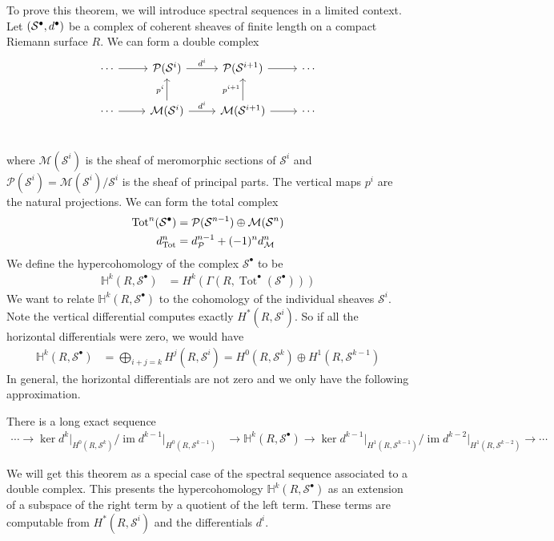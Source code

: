 \documentclass[12pt]{article}
\begin{document}
To prove this theorem, we will introduce spectral sequences in a limited context. Let $({\mathcal{S}}^{\bullet},d^{\bullet})$ be a complex of coherent sheaves of finite length on a compact Riemann surface $R$. We can form a double complex 
\[
\begin{tikzcd}[row sep=2em]
    \cdots \arrow[r] & \mathcal{P}(\mathcal{S}^i) \arrow[r, "d^i"] & \mathcal{P}(\mathcal{S}^{i+1}) \arrow[r] & \cdots \\
    \cdots \arrow[r] & \mathcal{M}(\mathcal{S}^i) \arrow[r, "d^i"] \arrow[u, "p^i"] & \mathcal{M}(\mathcal{S}^{i+1}) \arrow[r] \arrow[u, "p^{i+1}"] & \cdots \\
\end{tikzcd}
\] where $\mathcal{M}(\mathcal{S}^i)$ is the sheaf of meromorphic sections of $\mathcal{S}^i$ and $\mathcal{P}(\mathcal{S}^i) = \mathcal{M}(\mathcal{S}^i)/\mathcal{S}^i$ is the sheaf of principal parts. The vertical maps $p^i$ are the natural projections. We can form the total complex \begin{align*}
    \operatorname{Tot}^n(\mathcal{S}^{\bullet}) & = {\mathcal{P}}(\mathcal{S}^{n-1}) \oplus \mathcal{M}(\mathcal{S}^n) \\
    d_{\operatorname{Tot}}^n & = d_{{\mathcal{P}}}^{n-1} + (-1)^n d_{\mathcal{M}}^n
\end{align*} We define the hypercohomology of the complex $\mathcal{S}^{\bullet}$ to be \begin{align*}
    \mathbb{H}^k(R,\mathcal{S}^{\bullet}) & =  H^k(\Gamma(R,\operatorname{Tot}^{\bullet}(\mathcal{S}^{\bullet})))
\end{align*} We want to relate $\mathbb{H}^k(R,\mathcal{S}^{\bullet})$ to the cohomology of the individual sheaves $\mathcal{S}^i$. Note the vertical differential computes exactly $H^*(R,\mathcal{S}^i)$. So if all the horizontal differentials were zero, we would have \begin{align*}
    \mathbb{H}^k(R,\mathcal{S}^{\bullet}) & = \bigoplus_{i+j=k} H^j(R,\mathcal{S}^i) = H^0(R,\mathcal{S}^k) \oplus H^1(R,\mathcal{S}^{k-1})
\end{align*} In general, the horizontal differentials are not zero and we only have the following approximation.
\begin{theorem}\label{theorem:hypercohomology_long_exact_sequence}
    There is a long exact sequence \begin{align*}
        \cdots \to \ker{d^k\vert_{H^0(R,\mathcal{S}^k)}} \bigg / \operatorname{im}{d^{k-1}\vert_{H^0(R,\mathcal{S}^{k-1})}} & \to \mathbb{H}^k(R,\mathcal{S}^{\bullet}) \to \ker{d^{k-1}\vert_{H^1(R,\mathcal{S}^{k-1})}} \bigg/ \operatorname{im}{d^{k-2}\vert_{H^1(R,\mathcal{S}^{k-2})}} \to \cdots
    \end{align*}
\end{theorem}
We will get this theorem as a special case of the spectral sequence associated to a double complex. This presents the hypercohomology $\mathbb{H}^k(R,\mathcal{S}^{\bullet})$ as an extension of a subspace of the right term by a quotient of the left term. These terms are computable from $H^*(R,\mathcal{S}^i)$ and the differentials $d^i$.
\end{document}
